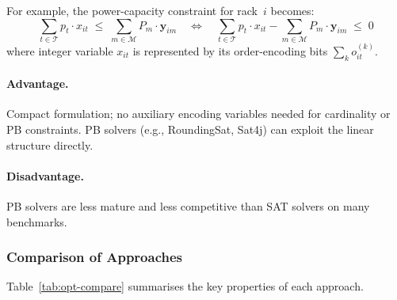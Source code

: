 \documentclass[11pt,a4paper]{article}
\newcommand{\setM}{\mathcal{M}}
\newcommand{\setT}{\mathcal{T}}
\begin{document}
For example, the power-capacity constraint for rack~$i$ becomes:
\[
  \sum_{t \in \setT} p_t \cdot x_{it}
  \;\le\;
  \sum_{m \in \setM} P_m \cdot \mathbf{y}_{im}
  \quad\Longleftrightarrow\quad
  \sum_{t \in \setT} p_t \cdot x_{it}
  - \sum_{m \in \setM} P_m \cdot \mathbf{y}_{im}
  \;\le\; 0
\]
where integer variable $x_{it}$ is represented by its
order-encoding bits $\sum_k o_{it}^{(k)}$.

\paragraph{Advantage.}
Compact formulation; no auxiliary encoding variables needed for
cardinality or PB constraints.
PB solvers (e.g., RoundingSat, Sat4j) can exploit the linear
structure directly.

\paragraph{Disadvantage.}
PB solvers are less mature and less competitive than SAT solvers
on many benchmarks.

\subsubsection{Comparison of Approaches}

Table~\ref{tab:opt-compare} summarises the key properties of
each approach.

\begin{table}[ht]
\centering
\caption{Comparison of SAT-based optimisation approaches.}
\label{tab:opt-compare}
\end{table}
\end{document}
